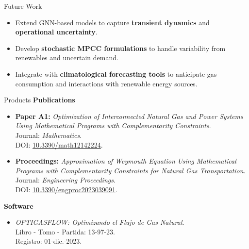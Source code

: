 \documentclass[hyperref={colorlinks,citecolor=blue,linkcolor=blue,urlcolor=blue}]{beamer}
\begin{document}
\begin{frame}{Future Work}
\begin{itemize}
    \item Extend GNN-based models to capture \textbf{transient dynamics} and \textbf{operational uncertainty}.
    \item Develop \textbf{stochastic MPCC formulations} to handle variability from renewables and uncertain demand.
    \item Integrate with \textbf{climatological forecasting tools} to anticipate gas consumption and interactions with renewable energy sources.
\end{itemize}
\end{frame}



\begin{frame}{Products}
\footnotesize
\textbf{Publications}
\begin{itemize}
    \item \textbf{Paper A1:} \emph{Optimization of Interconnected Natural Gas and Power Systems Using Mathematical Programs with Complementarity Constraints}.\\
    Journal: \textit{Mathematics}.\\
    DOI: \href{https://doi.org/10.3390/math12142224}{10.3390/math12142224}.
    
    \item \textbf{Proceedings:} \emph{Approximation of Weymouth Equation Using Mathematical Programs with Complementarity Constraints for Natural Gas Transportation}.\\
    Journal: \textit{Engineering Proceedings}.\\
    DOI: \href{https://doi.org/10.3390/engproc2023039091}{10.3390/engproc2023039091}.
\end{itemize}

\vspace{0.6em}

\textbf{Software}
\begin{itemize}
    \item \emph{OPTIGASFLOW: Optimizando el Flujo de Gas Natural}.\\
    Libro - Tomo - Partida: 13-97-23. \\
    Registro: 01-dic.-2023.
\end{itemize}
\end{frame}
\end{document}
